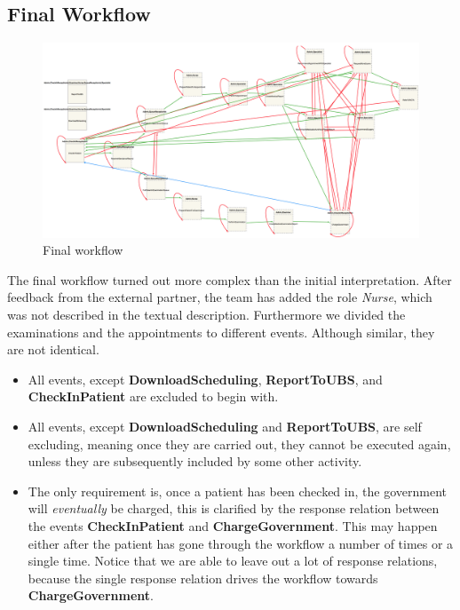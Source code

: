 \subsection{Final Workflow \label{sec:FinalWorkflow}}

\begin{figure}
\centering
\includegraphics[width=\linewidth]{Figures/finalbrazil}
\caption{\label{fig:FinalWorkflow} Final workflow}
\end{figure}

The final workflow turned out more complex than the initial interpretation. After feedback from the external partner, the team has added the role \textit{Nurse}, which was not described in the textual description. Furthermore we divided the examinations and the appointments to different events. Although similar, they are not identical. 
\begin{itemize}
\item All events, except \textbf{DownloadScheduling}, \textbf{ReportToUBS}, and \textbf{CheckInPatient} are excluded to begin with.
\item All events, except \textbf{DownloadScheduling} and \textbf{ReportToUBS}, are self excluding, meaning once they are carried out, they cannot be executed again, unless they are subsequently included by some other activity. 
\item The only requirement is, once a patient has been checked in, the government will \textit{eventually} be charged, this is clarified by the response relation between the events \textbf{CheckInPatient} and \textbf{ChargeGovernment}. This may happen either after the patient has gone through the workflow a number of times or a single time. Notice that we are able to leave out a lot of response relations, because the single response relation drives the workflow towards \textbf{ChargeGovernment}.
\end{itemize}

